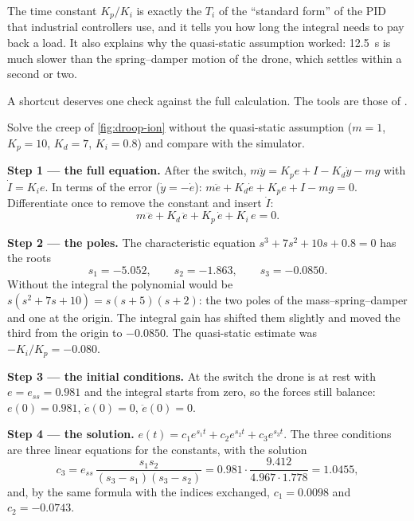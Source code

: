 The time constant $K_p/K_i$ is exactly the  $T_i$ of the \enquote{standard form} of the PID that industrial controllers use, and it tells you how long the integral needs to pay back a load. It also explains why the quasi-static assumption worked: \SI{12.5}{s} is much slower than the spring–damper motion of the drone, which settles within a second or two.

A shortcut deserves one check against the full calculation. The tools are those of .

\begin{example}
\label{ex:droop-exact}
Solve the creep of \cref{fig:droop-ion} without the quasi-static assumption ($m = 1$, $K_p = 10$, $K_d = 7$, $K_i = 0.8$) and compare with the simulator.

\textbf{Step 1 — the full equation.} After the switch, $m\ddot y = K_p e + I - K_d\dot y - mg$ with $\dot I = K_i e$. In terms of the error ($\dot y = -\dot e$): $m\ddot e + K_d\dot e + K_p e + I - mg = 0$. Differentiate once to remove the constant and insert $\dot I$:
\begin{equation*}
  m\,\dddot e + K_d\,\ddot e + K_p\,\dot e + K_i\,e = 0 .
\end{equation*}

\textbf{Step 2 — the poles.} The characteristic equation $s^3 + 7s^2 + 10s + 0.8 = 0$ has the roots
\begin{equation*}
  s_1 = -5.052, \qquad s_2 = -1.863, \qquad s_3 = -0.0850 .
\end{equation*}
Without the integral the polynomial would be $s(s^2 + 7s + 10) = s(s+5)(s+2)$: the two poles of the mass–spring–damper and one at the origin. The integral gain has shifted them slightly and moved the third from the origin to $-0.0850$. The quasi-static estimate was $-K_i/K_p = -0.080$.

\textbf{Step 3 — the initial conditions.} At the switch the drone is at rest with $e = e_{ss} = 0.981$ and the integral starts from zero, so the forces still balance: $e(0) = 0.981$, $\dot e(0) = 0$, $\ddot e(0) = 0$.

\textbf{Step 4 — the solution.} $e(t) = c_1e^{s_1t} + c_2e^{s_2t} + c_3e^{s_3t}$. The three conditions are three linear equations for the constants, with the solution
\begin{equation*}
  c_3 = e_{ss}\,\frac{s_1 s_2}{(s_3 - s_1)(s_3 - s_2)} = 0.981 \cdot \frac{9.412}{4.967 \cdot 1.778} = 1.0455,
\end{equation*}
and, by the same formula with the indices exchanged, $c_1 = 0.0098$ and $c_2 = -0.0743$.


\end{example}
